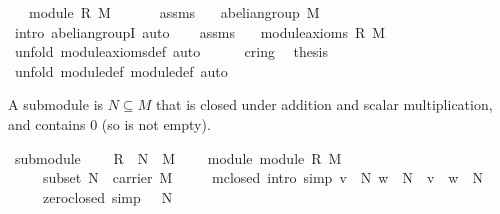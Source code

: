 \begin{isabellebody}
\ \ \ {\isachardoublequoteopen}module\ R\ M{\isachardoublequoteclose}\isanewline
%
\isadelimproof
%
\endisadelimproof
%
\isatagproof
{}\isamarkupfalse%
\ {\isacharminus}\ \isanewline
\ \ \isamarkupfalse%
\ assms\ \isamarkupfalse%
\ {}{\isacharcolon}\ {\isachardoublequoteopen}abelian{\isacharunderscore}group\ M{\isachardoublequoteclose}\ \isanewline
\ \ \ \ \isamarkupfalse%
\ {\isacharparenleft}intro\ abelian{\isacharunderscore}groupI{\isacharcomma}\ auto{\isacharparenright}\isanewline
\ \ \isamarkupfalse%
\ assms\ \isamarkupfalse%
\ {}{\isacharcolon}\ {\isachardoublequoteopen}module{\isacharunderscore}axioms\ R\ M{\isachardoublequoteclose}\isanewline
\ \ \ \ \isamarkupfalse%
\ {\isacharparenleft}unfold\ module{\isacharunderscore}axioms{\isacharunderscore}def{\isacharcomma}\ auto{\isacharparenright}\isanewline
\ \ \isamarkupfalse%
\ {}\ {}\ cring\ \isamarkupfalse%
\ {\isacharquery}thesis\ \isanewline
\ \ \ \ \isamarkupfalse%
\ {\isacharparenleft}unfold\ module{\isacharunderscore}def\ module{\isacharunderscore}def{\isacharcomma}\ auto{\isacharparenright}\isanewline
{}\isamarkupfalse%
%
\endisatagproof
{\isafoldproof}%
%
\isadelimproof
%
\endisadelimproof
%
\begin{isamarkuptext}%
A submodule is $N\subseteq M$ that is closed under addition and scalar multiplication, and
contains 0 (so is not empty).%
\end{isamarkuptext}%
\isamarkuptrue%
\isamarkupfalse%
\ submodule\ {\isacharequal}\isanewline
\ \ \ R\ \ N\ \ M\ {\isacharparenleft}\isanewline
\ \ \ module{\isacharcolon}\ {\isachardoublequoteopen}module\ R\ M{\isachardoublequoteclose}\ \isanewline
\ \ \ \ \ subset{\isacharcolon}\ {\isachardoublequoteopen}N\ {\isasymsubseteq}\ carrier\ M{\isachardoublequoteclose}\isanewline
\ \ \ \ \ m{\isacharunderscore}closed\ {\isacharbrackleft}intro{\isacharcomma}\ simp{\isacharbrackright}{\isacharcolon}\ {\isachardoublequoteopen}{\isasymlbrakk}v\ {\isasymin}\ N{\isacharsemicolon}\ w\ {\isasymin}\ N{\isasymrbrakk}\ {\isasymLongrightarrow}\ v\ {\isasymoplus}\ w\ {\isasymin}\ N{\isachardoublequoteclose}\isanewline
\ \ \ \ \ zero{\isacharunderscore}closed\ {\isacharbrackleft}simp{\isacharbrackright}{\isacharcolon}\ {\isachardoublequoteopen}{\isasymzero}\ {\isasymin}\ N{\isachardoublequoteclose}\ \isanewline

\end{isabellebody}
